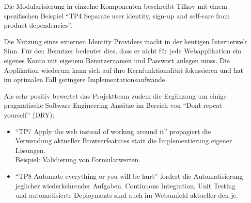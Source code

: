 Die Modularisierung in einzelne Komponenten beschreibt Tilkov mit einem spezifischen Beispiel ``TP4 Separate user identity, sign-up and self-care from product dependencies''.

Die Nutzung eines externen Identity Providers macht in der heutigen Internetwelt Sinn. Für den Benutzer bedeutet dies, dass er nicht für jede Webapplikation ein eigenes Konto mit eigenem Benutzernamen und Passwort anlegen muss. Die Applikation wiederum kann sich auf ihre Kernfunktionalität fokussieren und hat im optimalen Fall geringere Implementationsaufwände.

Als sehr positiv bewertet das Projektteam zudem die Ergänzung um einige pragmatische Software Engineering Ansätze im Bereich von ``Don\'t repeat yourself'' (DRY);

\begin{itemize}
	\item ``TP7 Apply the web instead of working around it'' propagiert die Verwendung aktueller Browserfeatures statt die Implementierung eigener Lösungen.\\
	Beispiel: Validierung von Formularwerten.
	\item ``TP8 Automate everything or you will be hurt'' fordert die Automatisierung jeglicher wiederkehrender Aufgaben. Continuous Integration, Unit Testing und automatisierte Deployments sind auch im Webumfeld aktueller den je.
\end{itemize}